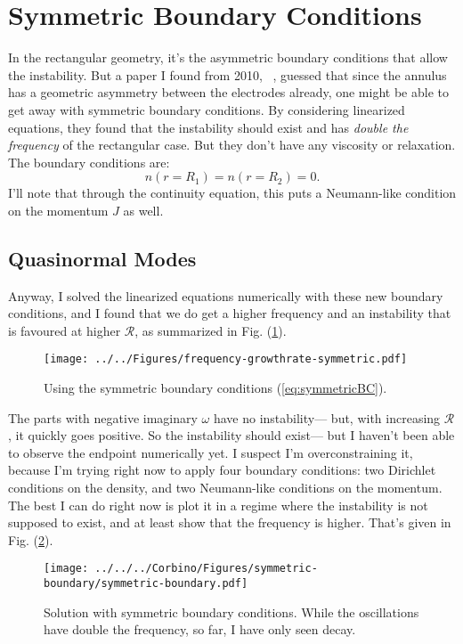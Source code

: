 \documentclass[12pt]{article}
\begin{document}
	\section{Symmetric Boundary Conditions}
	In the rectangular geometry, it's the asymmetric boundary conditions that allow the instability.  But a paper I found from 2010, ~\cite{Sydoruk2010}, guessed that since the annulus has a geometric asymmetry between the electrodes already, one might be able to get away with symmetric boundary conditions.  By considering linearized equations, they found that the instability should exist and has \textit{double the frequency} of the rectangular case.  But they don't have any viscosity or relaxation.  The boundary conditions are:
	\begin{equation}
	\label{eq:symmetricBC}
	n(r = R_1) = n(r = R_2) = 0.
	\end{equation}
	I'll note that through the continuity equation, this puts a Neumann-like condition on the momentum $J$ as well. 
	
	\subsection{Quasinormal Modes}
	Anyway, I solved the linearized equations numerically with these new boundary conditions, and I found that we do get a higher frequency and an instability that is favoured at higher $\mathcal{R}$, as summarized in Fig. (\ref{fig:symmetricBCfreq}).
	
	\begin{figure}[ht]
		\centering
		\texttt{[image: ../../Figures/frequency-growthrate-symmetric.pdf]}
		\caption{Using the symmetric boundary conditions (\ref{eq:symmetricBC}).}\label{fig:symmetricBCfreq}
	\end{figure}
	The parts with negative imaginary $\omega$ have no instability--- but, with increasing $\mathcal{R}$, it quickly goes positive.  So the instability should exist--- but I haven't been able to observe the endpoint numerically yet.  I suspect I'm overconstraining it, because I'm trying right now to apply four boundary conditions: two Dirichlet conditions on the density, and two Neumann-like conditions on the momentum.  The best I can do right now is plot it in a regime where the instability is not supposed to exist, and at least show that the frequency is higher.  That's given in Fig. (\ref{fig:symmetric-boundary}).
	
	\begin{figure}[ht]
		\centering
		\texttt{[image: ../../../Corbino/Figures/symmetric-boundary/symmetric-boundary.pdf]}
		\caption{Solution with symmetric boundary conditions.  While the oscillations have double the frequency, so far, I have only seen decay.}\label{fig:symmetric-boundary}
	\end{figure}
	
	{}
	
\end{document}
